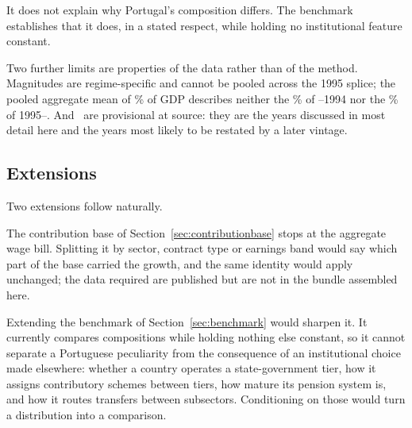 It does not explain why Portugal's composition differs. The benchmark establishes that
it does, in a stated respect, while holding no institutional feature constant.

Two further limits are properties of the data rather than of the method. Magnitudes
are regime-specific and cannot be pooled across the 1995 splice; the pooled aggregate
mean of \GgMeanPooled\% of GDP describes neither the \GgMeanHistorical\% of
\PanelStart--1994 nor the \GgMeanModern\% of 1995--\PanelEnd. And
\ProvisionalYears\ are provisional at source: they are the years discussed in most
detail here and the years most likely to be restated by a later vintage.

\subsection{Extensions}

Two extensions follow naturally.

The contribution base of Section~\ref{sec:contributionbase} stops at the aggregate wage
bill. Splitting it by sector, contract type or earnings band would say which part of the
base carried the growth, and the same identity would apply unchanged; the data required
are published but are not in the bundle assembled here.

Extending the benchmark of Section~\ref{sec:benchmark} would sharpen it. It currently
compares compositions while holding nothing else constant, so it cannot separate a
Portuguese peculiarity from the consequence of an institutional choice made elsewhere:
whether a country operates a state-government tier, how it assigns contributory schemes
between tiers, how mature its pension system is, and how it routes transfers between
subsectors. Conditioning on those would turn a distribution into a comparison.

